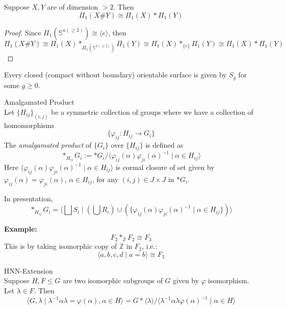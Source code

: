 \begin{proposition}
    Suppose $X,Y$ are of dimension $>2$. Then
    $$\Pi_1(X \# Y) \cong \Pi_1(X) * \Pi_1(Y)$$
\end{proposition}

\begin{proof}
    Since $\Pi_1 (\mathbb{S}^{n(\geq 2)}) \cong \langle e \rangle$, then
    $$\Pi_1(X \# Y) \cong \Pi_1(X) *_{\Pi_1 (\mathbb{S}^{n(\geq 2)})} \Pi_1(Y) \cong \Pi_1(X) *_{\{e\}} \Pi_1(Y) \cong \Pi_1(X) * \Pi_1(Y)$$
\end{proof}

\begin{proposition}
    Every closed (compact without boundary) orientable surface is given by $S_g$ for some $g \geq 0$.
\end{proposition}

\begin{definition}{Amalgamated Product}\\
Let $\{ H_{ij} \}_{(i,j)}$ be a symmetric collection of groups where we have a collection of homomorphisms
$$\{ \varphi_{ij} : H_{ij} \to G_i\}$$
The \textit{amalgamated product} of $\{G_i\}$ over $\{H_{ij} \}$ is defined as
$$*_{H_{ij}} G_i := *G_i / \langle \varphi_{ij} (\alpha) \varphi_{ji} (\alpha)^{-1} \mid \alpha \in H_{ij} \rangle$$
Here $\langle \varphi_{ij} (\alpha) \varphi_{ji} (\alpha)^{-1} \mid \alpha \in H_{ij} \rangle$ is cormal closure of set given by $\varphi_{ij} (\alpha) = \varphi_{ji} (\alpha)$, $\alpha \in H_{ij}$, for any $(i,j) \in J \times J$ in $*G_i$.

In presentation,
$$*_{H_{ij}} G_i = \langle \bigsqcup S_i \mid (\bigcup R_i) \cup (\{ \varphi_{ij} (\alpha) \varphi_{ji} (\alpha)^{-1} \mid \alpha \in H_{ij} \}) \rangle$$
\end{definition}

\noindent\textbf{Example:} $$F_2 *_\mathbb{Z} F_2 \cong F_3$$
This is by taking isomorphic copy of $\mathbb{Z}$ in $F_2$, i.e.:
$$\langle a,b,c,d \mid a=b \rangle \cong F_3$$

\begin{definition}{HNN-Extension}\\
Suppose $H,F \leq G$ are two isomorphic subgroups of $G$ given by $\varphi$ isomorphism. Let $\lambda \in F$. Then
$$\langle G,\lambda \mid \lambda^{-1} \alpha \lambda = \varphi (\alpha), \alpha \in H \rangle = G * \langle \lambda \rangle / \langle \lambda^{-1} \alpha \lambda \varphi(\alpha)^{-1} \mid \alpha \in H \rangle$$
\end{definition}

